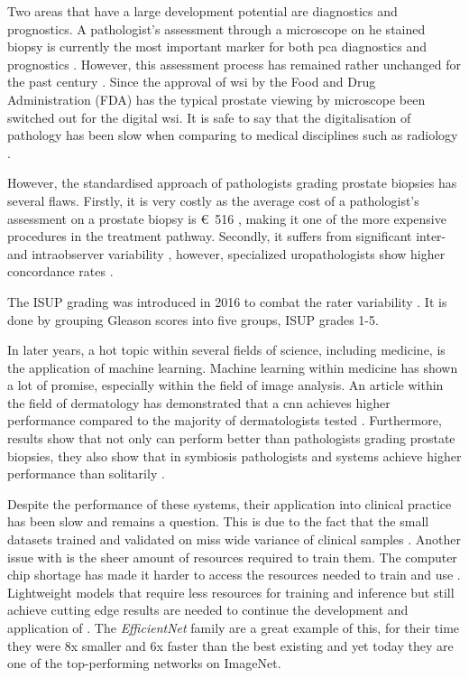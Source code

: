 \documentclass{mod-comjnl}
\begin{document}
Two areas that have a large development potential are diagnostics and prognostics. A pathologist's assessment through a microscope on \acrfull{he} stained biopsy is currently the most important marker for both \acrshort{pca} diagnostics and prognostics \cite{epstein_update_2010}. However, this assessment process has remained rather unchanged for the past century \cite{boyce_update_2017}. Since the approval of \acrfull{wsi} by the Food and Drug Administration (FDA) \cite{boyce_update_2017} has the typical prostate viewing by microscope been switched out for the digital \acrshort{wsi}. It is safe to say that the digitalisation of pathology has been slow when comparing to medical disciplines such as radiology \cite{zippel_rise_2021}.

However, the standardised approach of pathologists grading prostate biopsies has several flaws. Firstly, it is very costly as the average cost of a pathologist's assessment on a prostate biopsy is \SI{516}[\euro]{} \cite{hao_economic_2020}, making it one of the more expensive procedures in the treatment pathway. Secondly, it suffers from signiﬁcant inter- and intraobserver variability \cite{egevad_standardization_2013, allsbrook_interobserver_general_2001}, however, specialized uropathologists show higher concordance rates \cite{allsbrook_interobserver_uro_2001}.

The ISUP grading was introduced in 2016 to combat the rater variability \cite{egevad_international_2016}. It is done by grouping Gleason scores into five groups, ISUP grades 1-5. 

In later years, a hot topic within several fields of science, including medicine, is the application of machine learning. Machine learning within medicine has shown a lot of promise, especially  within the field of image analysis. An article within the field of dermatology has demonstrated that a \acrshort{cnn} achieves higher performance compared to the majority of dermatologists tested \cite{haenssle_man_2018}. Furthermore, results show that not only can  perform better than pathologists grading prostate biopsies, they also show that in symbiosis pathologists and  systems achieve higher performance than solitarily \cite{bulten_artificial_2021}.

Despite the performance of these systems, their application into clinical practice has been slow and remains a question. This is due to the fact that the small datasets trained and validated on miss wide variance of clinical samples \cite{campanella_clinical-grade_2019}. Another issue with  is the sheer amount of resources required to train them. The computer chip shortage has made it harder to access the resources needed to train and use . Lightweight models that require less resources for training and inference but still achieve cutting edge results are needed to continue the development and application of . The \textit{EfficientNet} family are a great example of this, for their time they were 8x smaller and 6x faster than the best existing  and yet today they are one of the top-performing networks on ImageNet.
\end{document}
